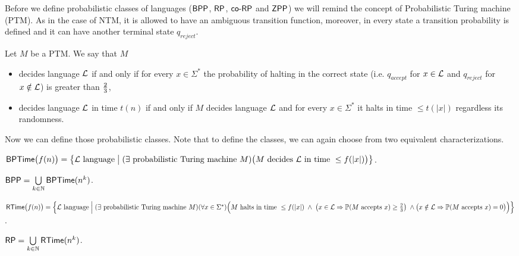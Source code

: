 		Before we define probabilistic classes of languages ($\mathsf{BPP}$, $\mathsf{RP}$, $\mathsf{co}\textnormal{-}\mathsf{RP}$ and $\mathsf{ZPP}$) we will remind the concept of Probabilistic Turing machine (PTM). As in the case of NTM, it is allowed to have an ambiguous transition function, moreover, in every state a transition probability is defined and it can have another terminal state $q_{reject}$.
		
		Let $M$ be a PTM. We say that $M$
		\begin{itemize}
			\item decides language $\cal L$ if and only if for every $x\in\Sigma^*$ the probability of halting in the correct state (i.e. $q_{accept}$ for $x\in{\cal L}$ and $q_{reject}$ for $x\notin{\cal L}$) is greater than $\nicefrac{2}{3}$,
			\item decides language $\cal L$ in time $t(n)$ if and only if $M$ decides language $\cal L$ and for every $x\in\Sigma^*$ it halts in time $\leq t(|x|)$ regardless its randomness.
		\end{itemize}
		Now we can define those probabilistic classes. Note that to define the classes, we can again choose from two equivalent characterizations.
		
		
		\begin{defn}\label{def:BPTime}
			$\mathsf{BPTime}\bigl(f(n)\bigr) = \bigl\{ {\cal L}\textnormal{ language} \bigm| (\exists \textnormal{ probabilistic Turing machine }M)\\ \bigl(M\textnormal{ decides }{\cal L}\textnormal{ in time }\leq f(|x|)\bigr) \bigr\}$.
		\end{defn}
		
		\begin{defn}
			$\mathsf{BPP} = \bigcup\limits_{k\in\mathbb{N}} \mathsf{BPTime}(n^k)$.
		\end{defn}
		
		\begin{defn}
			$\RTime\bigl(f(n)\bigr) = \Bigl\{ {\cal L}\textnormal{ language} \Bigm| (\exists \textnormal{ probabilistic Turing machine }M)\\ (\forall x\in\Sigma^*)\Bigl(M \textnormal{ halts in time } \leq f(|x|) \;\wedge\; \bigl( x\in{\cal L} \then \prob(M\textnormal{ accepts }x) \geq \nicefrac{2}{3} \bigr) \;\wedge\\ \bigl( x\notin{\cal L} \then \prob(M\textnormal{ accepts }x) = 0 \bigr) \Bigr) \Bigr\}$.
		\end{defn}
		
		\begin{defn}
			$\mathsf{RP} = \bigcup\limits_{k\in\mathbb{N}} \mathsf{RTime}(n^k)$.
		\end{defn}
		
